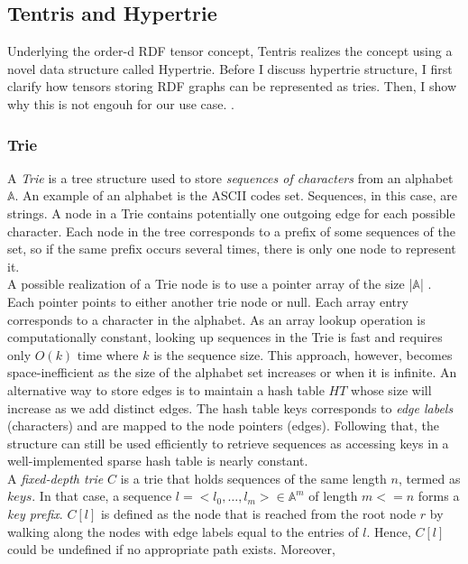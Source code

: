 \clearpage

\subsection{Tentris and Hypertrie}
\label{sec:hypertrie}
Underlying the order-d RDF tensor concept, Tentris realizes the concept using a novel data structure called Hypertrie. Before I discuss hypertrie structure, I first clarify how tensors storing RDF graphs can be represented as tries. Then, I show why this is not engouh for our use case. .

\subsubsection{Trie}
A \textit{Trie} \cite{Brass:2008:ADS:1434862} is a tree structure used to store \textit{sequences of characters} from an alphabet $\mathbb{A}$. An example of an alphabet is the ASCII codes set. Sequences, in this case, are strings. A node in a Trie contains potentially one outgoing edge for each possible character. Each node in the tree corresponds to a prefix of some sequences of the set, so if the same prefix occurs several times, there is only one node to represent it.\\

A possible realization of a Trie node is to use a pointer array of the size |$\mathbb{A}$| \cite{Brass:2008:ADS:1434862}. Each pointer points to either another trie node or null. Each array entry corresponds to a character in the alphabet. As an array lookup operation is computationally constant, looking up sequences in the Trie is fast and requires only $O(k)$ time where $k$ is the sequence size. This approach, however, becomes space-inefficient as the size of the alphabet set increases or when it is infinite. An alternative way to store edges is to maintain a hash table $HT$ whose size will increase as we add distinct edges. The hash table keys corresponds to \textit{edge labels} (characters) and are mapped to the node pointers (edges). Following that, the structure can still be used efficiently to retrieve sequences as accessing keys in a well-implemented sparse hash table is nearly constant. \\ 

A \textit{fixed-depth trie} $C$ is a trie that holds sequences of the same length $n$, termed as $keys$. In that case, a sequence $l = <l_0, … , l_m> \in \mathbb{A}^m$ of length $m <= n$ forms a \textit{key prefix}. $C[l]$ is defined as the node that is reached from the root node $r$ by walking along the nodes with edge labels equal to the entries of $l$. Hence, $C[l]$ could be undefined if no appropriate path exists. Moreover, \\

